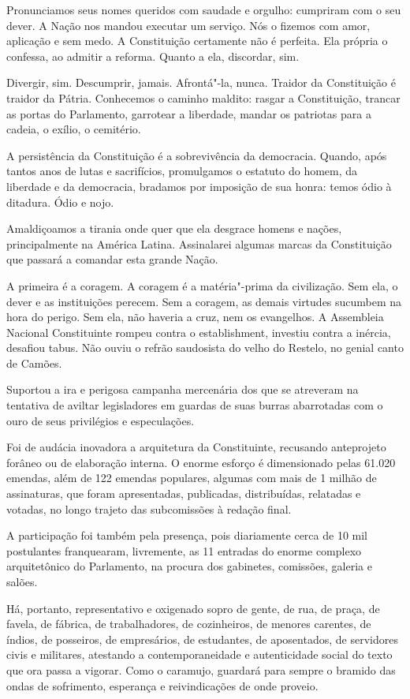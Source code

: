Pronunciamos seus nomes queridos com saudade e orgulho: cumpriram com o
seu dever. A Nação nos mandou executar um serviço. Nós o fizemos com
amor, aplicação e sem medo. A Constituição certamente não é perfeita.
Ela própria o confessa, ao admitir a reforma. Quanto a ela, discordar,
sim.

Divergir, sim. Descumprir, jamais. Afrontá"-la, nunca. Traidor da
Constituição é traidor da Pátria. Conhecemos o caminho maldito: rasgar a
Constituição, trancar as portas do Parlamento, garrotear a liberdade,
mandar os patriotas para a cadeia, o exílio, o cemitério.

A persistência da Constituição é a sobrevivência da democracia. Quando,
após tantos anos de lutas e sacrifícios, promulgamos o estatuto do
homem, da liberdade e da democracia, bradamos por imposição de sua
honra: temos ódio à ditadura. Ódio e nojo.

Amaldiçoamos a tirania onde quer que ela desgrace homens e nações,
principalmente na América Latina. Assinalarei algumas marcas da
Constituição que passará a comandar esta grande Nação.

A primeira é a coragem. A coragem é a matéria"-prima da civilização. Sem
ela, o dever e as instituições perecem. Sem a coragem, as demais
virtudes sucumbem na hora do perigo. Sem ela, não haveria a cruz, nem os
evangelhos. A Assembleia Nacional Constituinte rompeu contra o
establishment, investiu contra a inércia, desafiou tabus. Não ouviu o
refrão saudosista do velho do Restelo, no genial canto de Camões.

Suportou a ira e perigosa campanha mercenária dos que se atreveram na
tentativa de aviltar legisladores em guardas de suas burras abarrotadas
com o ouro de seus privilégios e especulações.

Foi de audácia inovadora a arquitetura da Constituinte, recusando
anteprojeto forâneo ou de elaboração interna. O enorme esforço é
dimensionado pelas 61.020 emendas, além de 122 emendas populares,
algumas com mais de 1 milhão de assinaturas, que foram apresentadas,
publicadas, distribuídas, relatadas e votadas, no longo trajeto das
subcomissões à redação final.

A participação foi também pela presença, pois diariamente cerca de 10
mil postulantes franquearam, livremente, as 11 entradas do enorme
complexo arquitetônico do Parlamento, na procura dos gabinetes,
comissões, galeria e salões.

Há, portanto, representativo e oxigenado sopro de gente, de rua, de
praça, de favela, de fábrica, de trabalhadores, de cozinheiros, de
menores carentes, de índios, de posseiros, de empresários, de
estudantes, de aposentados, de servidores civis e militares, atestando a
contemporaneidade e autenticidade social do texto que ora passa a
vigorar. Como o caramujo, guardará para sempre o bramido das ondas de
sofrimento, esperança e reivindicações de onde proveio.

